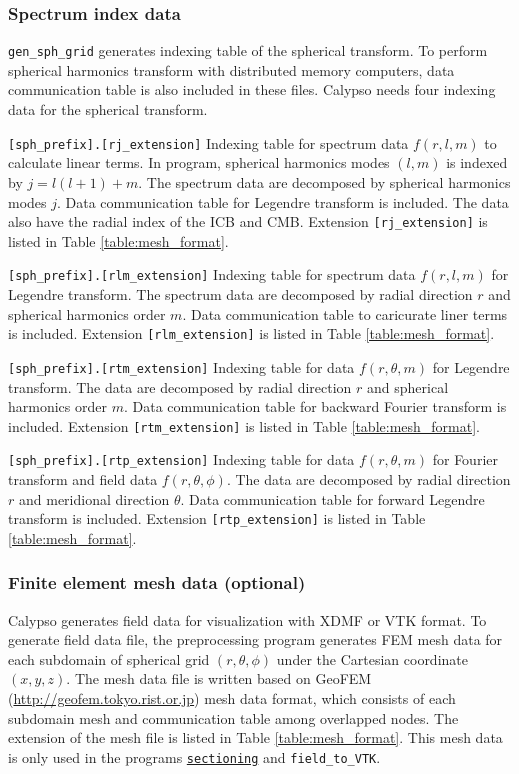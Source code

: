 \subsubsection{Spectrum index data}
\verb|gen_sph_grid| generates indexing table of the spherical transform. To perform spherical harmonics transform with distributed memory computers, data communication table is also included in these files. Calypso needs four indexing data for the spherical transform.
%
\begin{description}
\item{\verb|[sph_prefix].[rj_extension]|} Indexing table for spectrum data $f(r,l,m)$ to calculate linear terms. In program,  spherical harmonics modes $(l,m)$ is indexed by $j = l(l+1) + m$. The spectrum data are decomposed by spherical harmonics modes $j$. Data communication table for Legendre transform is included. The data also have the radial index of the ICB and CMB. Extension \verb|[rj_extension]| is listed in Table \ref{table:mesh_format}.
\item{\verb|[sph_prefix].[rlm_extension]|} Indexing table for spectrum data $f(r,l,m)$ for Legendre transform. The spectrum data are decomposed by radial direction $r$ and spherical harmonics order $m$. Data communication table to caricurate liner terms is included. Extension \verb|[rlm_extension]| is listed in Table \ref{table:mesh_format}.
\item{\verb|[sph_prefix].[rtm_extension]|} Indexing table for data $f(r,\theta,m)$ for Legendre transform. The data are decomposed by radial direction $r$ and spherical harmonics order $m$. Data communication table for backward Fourier transform is included. Extension \verb|[rtm_extension]| is listed in Table \ref{table:mesh_format}.
\item{\verb|[sph_prefix].[rtp_extension]|} Indexing table for data $f(r,\theta,m)$ for Fourier transform and field data $f(r,\theta,\phi)$. The data are decomposed by radial direction $r$ and meridional direction $\theta$. Data communication table for forward Legendre transform is included. Extension \verb|[rtp_extension]| is listed in Table \ref{table:mesh_format}.
\end{description}
%

\subsubsection{Finite element mesh data (optional)}
Calypso generates field data for visualization with XDMF or VTK format. To generate field data file, the preprocessing program generates FEM mesh data for each subdomain of spherical grid $(r,\theta,\phi)$ under the Cartesian coordinate $(x,y,z)$. The mesh data file is written based on GeoFEM (\url{http://geofem.tokyo.rist.or.jp}) mesh data format, which consists of each subdomain mesh and communication table among overlapped nodes. The extension of the mesh file is listed in Table \ref{table:mesh_format}. This mesh data is only used in the programs \hyperref[sec:sectioning]{\tt sectioning} and \verb|field_to_VTK|.

